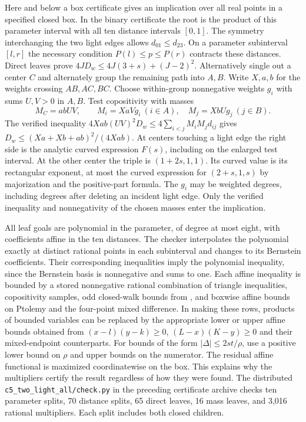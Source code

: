 \documentclass[11pt,a4paper]{article}
\theoremstyle{definition}
\begin{document}
Here and below a box certificate gives an implication over all real points
in a specified closed box. In the binary certificate the root is the
product of this parameter interval with all ten distance intervals
$[0,1]$. The symmetry interchanging the two light edges allows
$d_{01}\le d_{23}$. On a parameter subinterval $[l,r]$ the necessary
condition $P(l)\le p\le P(r)$ contracts these distances. Direct leaves
prove $4J D_w\le4J(3+s)+(J-2)^2$. Alternatively single out a center
$C$ and alternately group the remaining path into $A,B$. Write $X,a,b$
for the weights crossing $AB,AC,BC$. Choose within-group nonnegative
weights $g_i$ with sums $U,V>0$ in $A,B$. Test copositivity with masses
\[
 M_C=abUV,\qquad M_i=XaVg_i\ (i\in A),\quad M_j=XbUg_j\ (j\in B).
\]
The verified inequality
$4Xab(UV)^2 D_w\le4\sum_{i<j}M_iM_jd_{ij}$ gives
$D_w\le(Xa+Xb+ab)^2/(4Xab)$. At centers touching a light edge the
right side is the analytic curved expression $F(s)$, including on the
enlarged test interval. At the other center the triple is $(1+2s,1,1)$.
Its curved value is its rectangular exponent, at most the curved
expression for $(2+s,1,s)$ by majorization and the positive-part formula.
The $g_i$ may be weighted degrees, including degrees after deleting an
incident light edge. Only the verified inequality and nonnegativity
of the chosen masses enter the implication.

All leaf goals are polynomial in the parameter, of degree at most eight,
with coefficients affine in the ten distances. The checker interpolates
the polynomial exactly at distinct rational points in each subinterval
and changes to its Bernstein coefficients. Their corresponding
inequalities imply the polynomial inequality, since the Bernstein basis
is nonnegative and sums to one. Each affine inequality is bounded by a
stored nonnegative rational combination of triangle inequalities,
copositivity samples, odd closed-walk bounds from \cite{Jiang}, and
boxwise affine bounds on Ptolemy and the four-point mixed difference.
In making these rows, products of bounded variables can be replaced by
the appropriate lower or upper affine bounds obtained from
$(x-l)(y-k)\ge0$, $(L-x)(K-y)\ge0$ and their mixed-endpoint
counterparts. For bounds of the form $|\Delta|\le2st/\rho$, use a
positive lower bound on $\rho$ and upper bounds on the numerator.
The residual affine functional is maximized coordinatewise on the box.
This explains why the multipliers certify the result regardless of how
they were found. The distributed \texttt{c5\_two\_light\_all/check.py}
in the preceding certificate archive checks ten parameter splits,
70 distance splits, 65 direct leaves, 16 mass leaves, and 3,016 rational
multipliers. Each split includes both closed children.
\end{document}
